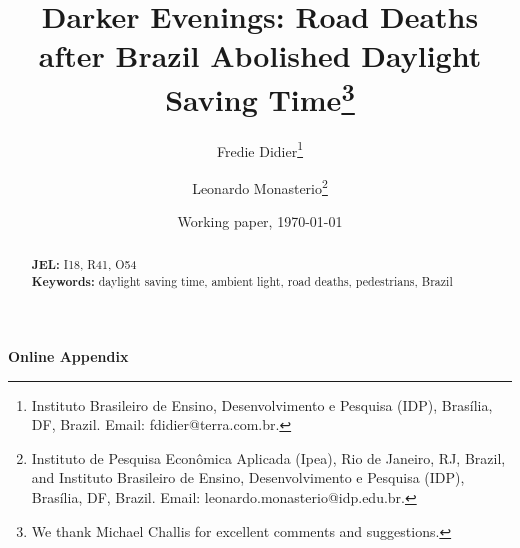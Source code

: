 \documentclass[12pt]{article}
\title{\textbf{Darker Evenings: Road Deaths after Brazil Abolished Daylight Saving Time}\thanks{\raggedright We thank Michael Challis for excellent comments and suggestions.}}
\author{Fredie Didier\thanks{\raggedright Instituto Brasileiro de Ensino, Desenvolvimento e Pesquisa (IDP), Bras\'ilia, DF, Brazil. Email: fdidier@terra.com.br.} \and Leonardo Monasterio\thanks{\raggedright Instituto de Pesquisa Econ\^omica Aplicada (Ipea), Rio de Janeiro, RJ, Brazil, and Instituto Brasileiro de Ensino, Desenvolvimento e Pesquisa (IDP), Bras\'ilia, DF, Brazil. Email: leonardo.monasterio@idp.edu.br.}}
\date{Working paper, \today}
\begin{document}
\begin{titlepage}
\maketitle
\begin{abstract}
\noindent

\medskip\noindent\textbf{JEL:} I18, R41, O54\\
\textbf{Keywords:} daylight saving time, ambient light, road deaths, pedestrians, Brazil
\end{abstract}
\thispagestyle{empty}
\end{titlepage}



\clearpage



\clearpage
\appendix
\setcounter{page}{1}
\renewcommand{\thepage}{A\arabic{page}}
\begin{center}\Large\textbf{Online Appendix}\end{center}
\makeatletter
{}
\renewcommand{\thefigure}{\thesection\arabic{figure}}
\renewcommand{\thetable}{\thesection\arabic{table}}
\makeatother

\end{document}
